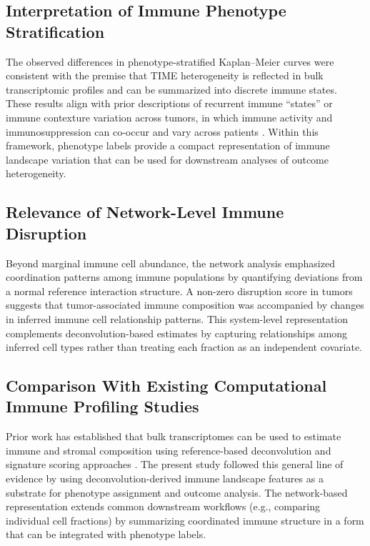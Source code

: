\documentclass[conference]{IEEEtran}
\begin{document}
\subsection{Interpretation of Immune Phenotype Stratification}
The observed differences in phenotype-stratified Kaplan--Meier curves were consistent with the premise that TIME heterogeneity is reflected in bulk transcriptomic profiles and can be summarized into discrete immune states.
These results align with prior descriptions of recurrent immune ``states'' or immune contexture variation across tumors, in which immune activity and immunosuppression can co-occur and vary across patients \cite{Fridman2017,Thorsson2018,ChenMellman2017}.
Within this framework, phenotype labels provide a compact representation of immune landscape variation that can be used for downstream analyses of outcome heterogeneity.

\subsection{Relevance of Network-Level Immune Disruption}
Beyond marginal immune cell abundance, the network analysis emphasized coordination patterns among immune populations by quantifying deviations from a normal reference interaction structure.
A non-zero disruption score in tumors suggests that tumor-associated immune composition was accompanied by changes in inferred immune cell relationship patterns.
This system-level representation complements deconvolution-based estimates by capturing relationships among inferred cell types rather than treating each fraction as an independent covariate.

\subsection{Comparison With Existing Computational Immune Profiling Studies}
Prior work has established that bulk transcriptomes can be used to estimate immune and stromal composition using reference-based deconvolution and signature scoring approaches \cite{Newman2015,Finotello2019,Becht2016,Aran2017xCell,Sturm2019}.
The present study followed this general line of evidence by using deconvolution-derived immune landscape features as a substrate for phenotype assignment and outcome analysis.
The network-based representation extends common downstream workflows (e.g., comparing individual cell fractions) by summarizing coordinated immune structure in a form that can be integrated with phenotype labels.
\end{document}
